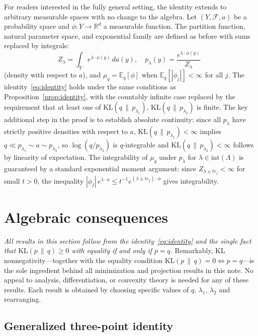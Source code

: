 \documentclass[11pt, a4paper, 
onecolumn, 
showabstract]{naverlabseurope-onecol-flex}
\theoremstyle{definition}
\theoremstyle{remark}
\newcommand{\KL}[2]{\mathrm{KL}\!\left(#1 \,\|\, #2\right)}
\newcommand{\E}{\mathbb{E}}
\newcommand{\R}{\mathbb{R}}
\newcommand{\cF}{\mathcal{F}}
\begin{document}
For readers interested in the fully general setting, the identity extends to arbitrary measurable spaces with no change to the algebra.
Let $(Y, \cF, a)$ be a probability space and $\phi \colon Y \to \R^d$ a measurable function.
The partition function, natural parameter space, and exponential family are defined as before with sums replaced by integrals:
\[
    Z_\lambda = \int_Y e^{\lambda \cdot \phi(y)}\, da(y), \quad
    p_\lambda(y) = \frac{e^{\lambda \cdot \phi(y)}}{Z_\lambda}
\]
(density with respect to $a$), and $\mu_q = \E_q[\phi]$ when $\E_q[|\phi_j|] < \infty$ for all $j$.
The identity~\eqref{eq:identity} holds under the same conditions as Proposition~\ref{prop:identity}, with the countably infinite case replaced by the requirement that at least one of $\KL{q}{p_{\lambda_1}}$, $\KL{q}{p_{\lambda_2}}$ is finite.
The key additional step in the proof is to establish absolute continuity: since all $p_\lambda$ have strictly positive densities with respect to $a$, $\KL{q}{p_{\lambda_1}} < \infty$ implies $q \ll p_{\lambda_1} \sim a \sim p_{\lambda_2}$, so $\log(q/p_{\lambda_2})$ is $q$-integrable and $\KL{q}{p_{\lambda_2}} < \infty$ follows by linearity of expectation.
The integrability of $\mu_q$ under $p_\lambda$ for $\lambda \in \mathrm{int}(\Lambda)$ is guaranteed by a standard exponential moment argument: since $Z_{\lambda \pm te_j} < \infty$ for small $t > 0$, the inequality $|\phi_j|\,e^{\lambda\cdot\phi} \leq t^{-1} e^{(\lambda \pm te_j)\cdot\phi}$ gives integrability.

\section{Algebraic consequences}\label{sec:algebraic}

\textit{All results in this section follow from the identity~\eqref{eq:identity} and the single fact that $\KL{p}{q} \geq 0$ with equality if and only if $p = q$.}
Remarkably, KL nonnegativity---together with the equality condition $\KL{p}{q} = 0 \iff p = q$---is the sole ingredient behind all minimization and projection results in this note.
No appeal to analysis, differentiation, or convexity theory is needed for any of these results.
Each result is obtained by choosing specific values of $q$, $\lambda_1$, $\lambda_2$ and rearranging.

\subsection{Generalized three-point identity}
\end{document}
